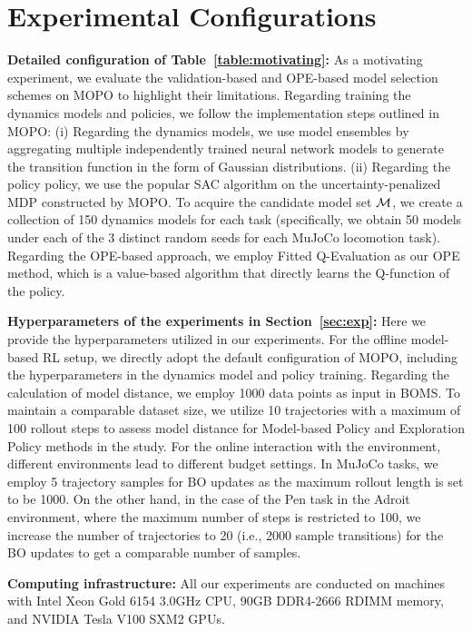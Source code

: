 \newpage
\section{Experimental Configurations}
\label{app:config}


\noindent\textbf{Detailed configuration of Table~\ref{table:motivating}:} 
As a motivating experiment, we evaluate the validation-based and OPE-based model selection schemes on MOPO to highlight their limitations.
Regarding training the dynamics models and policies, we follow
the implementation steps outlined in MOPO: (i) Regarding the
dynamics models, we use model ensembles by aggregating multiple
independently trained neural network models to generate the
transition function in the form of Gaussian distributions. (ii) Regarding the policy policy, we use the popular SAC algorithm on the uncertainty-penalized MDP constructed by MOPO. To acquire the
candidate model set $\operatorname{\mathcal{M}}$, we create a collection of 150 dynamics models for each task (specifically, we obtain 50 models under each
of the 3 distinct random seeds for each MuJoCo locomotion task).
Regarding the OPE-based approach, we employ Fitted Q-Evaluation \citep{le2019batch} as our OPE method, which is a value-based algorithm that directly learns the Q-function of the policy.

\noindent\textbf{Hyperparameters of the experiments in Section~\ref{sec:exp}:}
Here we provide the hyperparameters utilized in our experiments. For the offline model-based RL setup, we directly adopt the default configuration of MOPO, including the hyperparameters in the dynamics model and policy training.
Regarding the calculation of model distance, we employ 1000 data points as input in BOMS. To maintain a comparable dataset size, we utilize 10 trajectories with a maximum of 100 rollout steps to assess model distance for Model-based Policy and Exploration Policy methods in the study.
For the online interaction with the environment, different environments lead to different budget settings. In MuJoCo tasks, we employ 5 trajectory samples for BO updates as the maximum rollout length is set to be 1000.
On the other hand, in the case of the Pen task in the Adroit environment, where the maximum number of steps is restricted to 100, we increase the number of trajectories to 20 (i.e., 2000 sample transitions) for the BO updates to get a comparable number of samples.

{\textbf{Computing infrastructure:} All our experiments are conducted on machines with Intel Xeon Gold 6154 3.0GHz CPU, 90GB DDR4-2666 RDIMM memory, and NVIDIA Tesla V100 SXM2 GPUs.}

